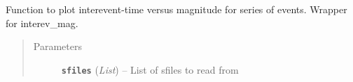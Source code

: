 \documentclass[a4paper,10pt,english]{sphinxmanual}
\begin{document}

\begin{fulllineitems}
\label{submodules/utils.EQcorrscan_plotting:EQcorrscan_plotting.interev_mag_sfiles}
Function to plot interevent-time versus magnitude for series of events.
Wrapper for interev\_mag.
\begin{quote}\begin{description}
\item[{Parameters}] \leavevmode
\textbf{\texttt{sfiles}} (\emph{List}) -- List of sfiles to read from

\end{description}\end{quote}

\end{fulllineitems}

\end{document}
